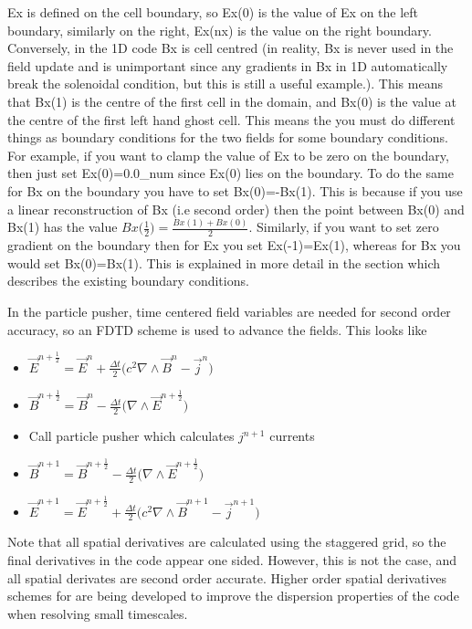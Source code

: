 \documentclass[12pt,a4paper]{article}
\newcommand{\EPOCH}{{\color{warwickdark}\fontfamily{phv}\selectfont{EPOCH}}}
\begin{document}
Ex is defined on the cell boundary, so Ex(0) is the value of Ex on the left
boundary, similarly on the right, Ex(nx) is the value on the right
boundary. Conversely, in the 1D code Bx is cell centred (in reality, Bx is
never used in the field update and is unimportant since any gradients in Bx in
1D automatically break the solenoidal condition, but this is still a useful
example.). This means that Bx(1) is the centre of the first cell in the domain,
and Bx(0) is the value at the centre of the first left hand ghost cell. This
means the you must do different things as boundary conditions for the two
fields for some boundary conditions.\\

For example, if you want to clamp the value of Ex to be zero on the boundary,
then just set Ex(0)=0.0\_num since Ex(0) lies on the boundary. To do the same
for Bx on the boundary you have to set Bx(0)=-Bx(1). This is because if you use
a linear reconstruction of Bx (i.e second order) then the point between Bx(0)
and Bx(1) has the value $Bx\bigl( \frac{1}{2} \bigr) =
\frac{Bx(1)+Bx(0)}{2}$. Similarly, if you want to set zero gradient on the
boundary then for Ex you set Ex(-1)=Ex(1), whereas for Bx you would set
Bx(0)=Bx(1). This is explained in more detail in the section which describes
the existing {\EPOCH} boundary conditions.

In the particle pusher, time centered field variables are needed for second
order accuracy, so an FDTD scheme is used to advance the fields. This looks
like

\begin{itemize}
\item $\vec{E}^{n+\frac{1}{2}} = \vec{E}^n + \frac{\Delta t}{2} \bigl( c^2
  \nabla \wedge \vec{B}^{n} -\vec{j}^{n} \bigr)$
\item $\vec{B}^{n+\frac{1}{2}} = \vec{B}^n - \frac{\Delta t}{2} \bigl( \nabla
  \wedge \vec{E}^{n+\frac{1}{2}} \bigr)$
\item Call particle pusher which calculates $j^{n+1}$ currents
\item $\vec{B}^{n+1} = \vec{B}^{n+\frac{1}{2}} - \frac{\Delta t}{2} \bigl(
  \nabla \wedge \vec{E}^{n+\frac{1}{2}} \bigr)$
\item $\vec{E}^{n+1} = \vec{E}^{n+\frac{1}{2}} + \frac{\Delta t}{2} \bigl( c^2
  \nabla \wedge \vec{B} ^{n+1} - \vec{j}^{n+1} \bigr)$
\end{itemize}
Note that all spatial derivatives are calculated using the staggered grid, so
the final derivatives in the code appear one sided. However, this is not the
case, and all spatial derivates are second order accurate. Higher order spatial
derivatives schemes for {\EPOCH} are being developed to improve the dispersion
properties of the code when resolving small timescales.
\end{document}
